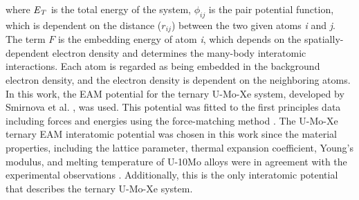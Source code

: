 \documentclass[preprint,12pt]{elsarticle}
\begin{document}
\noindent where $\it{E}_{T}$ is the total energy of the system, $\phi_{ij}$ is the pair potential function, which is dependent on the distance ($r_{ij}$) between the two given atoms \textit{i} and \textit{j}. The term $F$ is the embedding energy of {atom \textit{i}}, which depends on the spatially-dependent electron density and determines the many-body interatomic interactions. Each atom is regarded as being embedded in the background electron density, and the electron density is dependent on the neighboring atoms. In this work, the EAM potential for the ternary U-Mo-Xe system, developed by Smirnova et al. \cite{smirnova2013ternary}, was used. This potential was fitted to the first principles data including forces and energies using the force-matching method \cite{ercolessi1994interatomic}. The U-Mo-Xe ternary EAM interatomic potential was chosen in this work since the material properties, including the lattice parameter, thermal expansion coefficient, Young's modulus, and melting temperature of U-10Mo alloys were in agreement with the experimental observations \cite{smirnova2013ternary}. Additionally, this is the only interatomic potential that describes the ternary U-Mo-Xe system.
\end{document}

